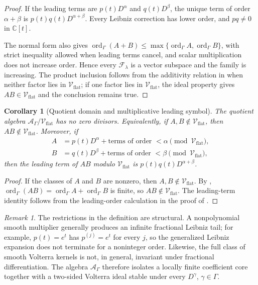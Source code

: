 \documentclass[11pt]{article}
\numberwithin{equation}{section}
\newtheorem{corollary}{Corollary}
\theoremstyle{definition}
\theoremstyle{remark}
\newtheorem{remark}{Remark}
\newcommand{\C}{\mathbb C}
\newcommand{\A}{\mathcal A}
\newcommand{\Vflat}{\mathcal V_{\mathrm{flat}}}
\newcommand{\ord}{\operatorname{ord}}
\begin{document}
\begin{proof}
If the leading terms are $p(t)D^\alpha$ and $q(t)D^\beta$, the unique term of order $\alpha+\beta$ is $p(t)q(t)D^{\alpha+\beta}$. Every Leibniz correction has lower order, and $pq\ne0$ in $\C[t]$.

The normal form also gives $\ord_\Gamma(A+B)\le\max\{\ord_\Gamma A,\ord_\Gamma B\}$, with strict inequality allowed when leading terms cancel, and scalar multiplication does not increase order. Hence every $\mathcal F_\lambda$ is a vector subspace and the family is increasing. The product inclusion follows from the additivity relation in  when neither factor lies in $\Vflat$; if one factor lies in $\Vflat$, the ideal property gives $AB\in\Vflat$ and the conclusion remains true.
\end{proof}

\begin{corollary}[Quotient domain and multiplicative leading symbol]\label{cor:quotient-domain}
The quotient algebra $\A_\Gamma/\Vflat$ has no zero divisors. Equivalently, if $A,B\notin\Vflat$, then $AB\notin\Vflat$. Moreover, if
\begin{align*}
A&=p(t)D^\alpha+\text{terms of order }<\alpha \pmod{\Vflat},\\
B&=q(t)D^\beta+\text{terms of order }<\beta \pmod{\Vflat},
\end{align*}
then the leading term of $AB$ modulo $\Vflat$ is $p(t)q(t)D^{\alpha+\beta}$.
\end{corollary}

\begin{proof}
If the classes of $A$ and $B$ are nonzero, then $A,B\notin\Vflat$. By , $\ord_\Gamma(AB)=\ord_\Gamma A+\ord_\Gamma B$ is finite, so $AB\notin\Vflat$. The leading-term identity follows from the leading-order calculation in the proof of .
\end{proof}

\begin{remark}
The restrictions in the definition are structural. A nonpolynomial smooth multiplier generally produces an infinite fractional Leibniz tail; for example, $p(t)=e^t$ has $p^{(j)}=e^t$ for every $j$, so the generalized Leibniz expansion does not terminate for a noninteger order. Likewise, the full class of smooth Volterra kernels is not, in general, invariant under fractional differentiation. The algebra $\A_\Gamma$ therefore isolates a locally finite coefficient core together with a two-sided Volterra ideal stable under every $D^\gamma$, $\gamma\in\Gamma$.
\end{remark}
\end{document}
